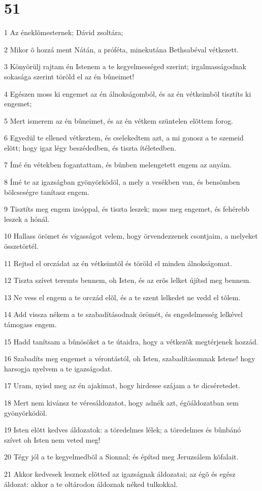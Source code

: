 \chapter{51}

\par 1 Az éneklõmesternek; Dávid zsoltára;
\par 2 Mikor õ hozzá ment Nátán, a próféta, minekutána Bethsabéval vétkezett.
\par 3 Könyörülj rajtam én Istenem a te kegyelmességed szerint; irgalmasságodnak sokasága szerint töröld el az én bûneimet!
\par 4 Egészen moss ki engemet az én álnokságomból, és az én vétkeimbõl tisztíts ki engemet;
\par 5 Mert ismerem az én bûneimet, és az én vétkem szüntelen elõttem forog.
\par 6 Egyedül te ellened vétkeztem, és cselekedtem azt, a mi gonosz a te szemeid elõtt; hogy igaz légy beszédedben, és tiszta ítéletedben.
\par 7 Ímé én vétekben fogantattam, és bûnben melengetett engem az anyám.
\par 8 Ímé te az igazságban gyönyörködöl, a mely a vesékben van, és bensõmben bölcseségre tanítasz engem.
\par 9 Tisztíts meg engem izsóppal, és tiszta leszek; moss meg engemet, és fehérebb leszek a hónál.
\par 10 Hallass örömet és vígasságot velem, hogy örvendezzenek csontjaim, a melyeket összetörtél.
\par 11 Rejtsd el orczádat az én vétkeimtõl és töröld el minden álnokságomat.
\par 12 Tiszta szívet teremts bennem, oh Isten, és az erõs lelket újítsd meg bennem.
\par 13 Ne vess el engem a te orczád elõl, és a te szent lelkedet ne vedd el tõlem.
\par 14 Add vissza nékem a te szabadításodnak örömét, és engedelmesség lelkével támogass engem.
\par 15 Hadd tanítsam a bûnösöket a te útaidra, hogy a vétkezõk megtérjenek hozzád.
\par 16 Szabadíts meg engemet a vérontástól, oh Isten, szabadításomnak Istene! hogy harsogja nyelvem a te igazságodat.
\par 17 Uram, nyisd meg az én ajakimat, hogy hirdesse szájam a te dicséretedet.
\par 18 Mert nem kivánsz te véresáldozatot, hogy adnék azt, égõáldozatban sem gyönyörködöl.
\par 19 Isten elõtt kedves áldozatok: a töredelmes lélek; a töredelmes és bûnbánó szívet oh Isten nem veted meg!
\par 20 Tégy jól a te kegyelmedbõl a Sionnal; és építsd meg Jeruzsálem kõfalait.
\par 21 Akkor kedvesek lesznek elõtted az igazságnak áldozatai; az égõ és egész áldozat: akkor a te oltárodon áldoznak néked tulkokkal.

